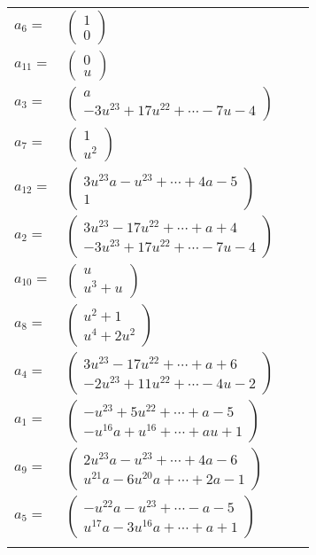 \documentclass[1p]{elsarticle_modified}
\theoremstyle{definition}
\begin{document}
\begin{tabular}{m{7pt} m{180pt} m{7pt} m{180pt} }
\flushright $a_{6}=$&$\begin{pmatrix}1\\0\end{pmatrix}$ \\
\flushright $a_{11}=$&$\begin{pmatrix}0\\u\end{pmatrix}$ \\
\flushright $a_{3}=$&$\begin{pmatrix}a\\-3 u^{23}+17 u^{22}+\cdots-7 u-4\end{pmatrix}$ \\
\flushright $a_{7}=$&$\begin{pmatrix}1\\u^2\end{pmatrix}$ \\
\flushright $a_{12}=$&$\begin{pmatrix}3 u^{23} a- u^{23}+\cdots+4 a-5\\1\end{pmatrix}$ \\
\flushright $a_{2}=$&$\begin{pmatrix}3 u^{23}-17 u^{22}+\cdots+a+4\\-3 u^{23}+17 u^{22}+\cdots-7 u-4\end{pmatrix}$ \\
\flushright $a_{10}=$&$\begin{pmatrix}u\\u^3+u\end{pmatrix}$ \\
\flushright $a_{8}=$&$\begin{pmatrix}u^2+1\\u^4+2 u^2\end{pmatrix}$ \\
\flushright $a_{4}=$&$\begin{pmatrix}3 u^{23}-17 u^{22}+\cdots+a+6\\-2 u^{23}+11 u^{22}+\cdots-4 u-2\end{pmatrix}$ \\
\flushright $a_{1}=$&$\begin{pmatrix}- u^{23}+5 u^{22}+\cdots+a-5\\- u^{16} a+u^{16}+\cdots+a u+1\end{pmatrix}$ \\
\flushright $a_{9}=$&$\begin{pmatrix}2 u^{23} a- u^{23}+\cdots+4 a-6\\u^{21} a-6 u^{20} a+\cdots+2 a-1\end{pmatrix}$ \\
\flushright $a_{5}=$&$\begin{pmatrix}- u^{22} a- u^{23}+\cdots- a-5\\u^{17} a-3 u^{16} a+\cdots+a+1\end{pmatrix}$\\&\end{tabular}
\end{document}
